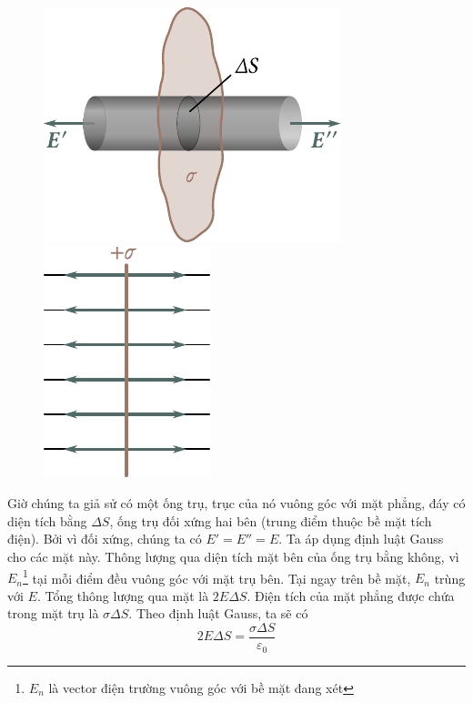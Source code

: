 \begin{figure}[!htb]
	\begin{minipage}[t]{0.5\linewidth}
		\begin{center}
			\includegraphics[scale=1]{figures/ch_01/fig_1_37.pdf}
			\caption[]{}
			\label{fig:1_37}
		\end{center}
	\end{minipage}
	\hspace{-0.05cm}
	\begin{minipage}[t]{0.5\linewidth}
		\begin{center}
			\includegraphics[scale=1]{figures/ch_01/fig_1_38.pdf}
			\caption[]{}
			\label{fig:1_38}
		\end{center}
	\end{minipage}
\vspace{-0.4cm}
\end{figure}

Giờ chúng ta giả sử có một ống trụ, trục của nó vuông góc với mặt phẳng, đáy có diện tích bằng $\Delta{S}$, ống trụ đối xứng hai bên (trung điểm thuộc bề mặt tích điện). Bởi vì đối xứng, chúng ta có $E'=E''=E$. Ta áp dụng định luật Gauss cho các mặt này. Thông lượng qua diện tích mặt bên của ống trụ bằng không, vì $E_n$\footnote{$E_n$ là vector điện trường vuông góc với bề mặt đang xét} tại mỗi điểm đều vuông góc với mặt trụ bên. Tại ngay trên bề mặt, $E_n$ trùng với $E$. Tổng thông lượng qua mặt là $2E\Delta{S}$. Điện tích của mặt phẳng được chứa trong mặt trụ là $\sigma\Delta{S}$. Theo định luật Gauss, ta sẽ có
\begin{equation*}
	2E\Delta{S} = \frac{\sigma\Delta{S}}{\varepsilon_0}
\end{equation*}

